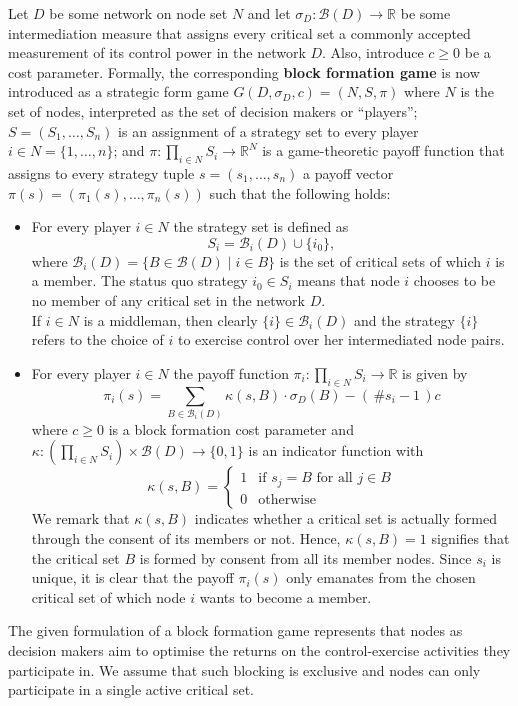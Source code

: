 Let $D$ be some network on node set $N$ and let $\sigma_D \colon \mathcal{B} (D) \to \mathbb{R}$ be some intermediation measure that assigns every critical set a commonly accepted measurement of its control power in the network $D$. Also, introduce $c \geqslant 0$ be a cost parameter. Formally, the corresponding \textbf{block formation game} is now introduced as a strategic form game $G (D, \sigma_D ,c ) = (N,S, \pi )$ where $N$ is the set of nodes, interpreted as the set of decision makers or ``players''; $S = (S_1, \ldots ,S_n )$ is an assignment of a strategy set to every player $i \in N = \{ 1, \ldots ,n \}$; and $\pi \colon \prod_{i \in N} S_i \to \mathbb{R}^N$ is a game-theoretic payoff function that assigns to every strategy tuple $s = (s_1, \ldots ,s_n)$ a payoff vector $\pi (s) = (\pi_1 (s), \ldots ,\pi_n (s))$ such that the following holds:
\begin{itemize}
\item For every player $i \in N$ the strategy set is defined as
\begin{equation}
S_i = \mathcal{B}_i (D) \cup \{ i_0 \} ,
\end{equation}
where $\mathcal{B}_i (D) = \{ B \in \mathcal{B} (D) \mid i \in B \}$ is the set of critical sets of which $i$ is a member. The status quo strategy $i_0 \in S_i$ means that node $i$ chooses to be no member of any critical set in the network $D$.
\\
If $i \in N$ is a middleman, then clearly $\{ i \} \in \mathcal{B}_i (D)$ and the strategy $\{ i \}$ refers to the choice of $i$ to exercise control over her intermediated node pairs.

\item For every player $i \in N$ the payoff function $\pi_i \colon \prod_{i \in N} S_i \to \mathbb{R}$ is given by
\begin{equation}
\pi_i (s) = \sum_{B \in \mathcal{B}_i (D)} \kappa (s,B) \cdot \sigma_D (B) - \left( \, \# s_i -1 \, \right) c
\end{equation}
where $c \geqslant 0$ is a block formation cost parameter and $\kappa \colon \left( \prod_{i \in N} S_i \right) \times \mathcal{B} (D) \to \{ 0,1 \}$ is an indicator function with
\begin{equation}
\kappa (s,B) = \left\{
\begin{array}{ll}
1 & \mbox{if } s_j = B \mbox{ for all } j \in B \\
0 & \mbox{otherwise}
\end{array}
\right.
\end{equation}
We remark that $\kappa (s,B)$ indicates whether a critical set is actually formed through the consent of its members or not. Hence, $\kappa (s,B)=1$ signifies that the critical set $B$ is formed by consent from all its member nodes. Since $s_i$ is unique, it is clear that the payoff $\pi_i (s)$ only emanates from the chosen critical set of which node $i$ wants to become a member.
\end{itemize}
The given formulation of a block formation game represents that nodes as decision makers aim to optimise the returns on the control-exercise activities they participate in. We assume that such blocking is exclusive and nodes can only participate in a single active critical set.

